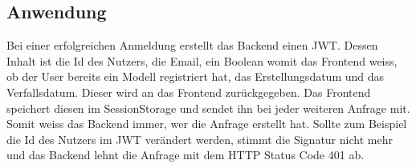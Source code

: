 \subsection{Anwendung} \label{andwendung-jwt}
Bei einer erfolgreichen Anmeldung erstellt das Backend einen JWT. Dessen Inhalt ist die Id des Nutzers, die Email, ein Boolean womit das Frontend weiss, ob der User bereits ein Modell registriert hat, das Erstellungsdatum und das Verfallsdatum. Dieser wird an das Frontend zurückgegeben. Das Frontend speichert diesen im SessionStorage und sendet ihn bei jeder weiteren Anfrage mit. Somit weiss das Backend immer, wer die Anfrage erstellt hat.
\newline
Sollte zum Beispiel die Id des Nutzers im  JWT verändert werden, stimmt die Signatur nicht mehr und das Backend lehnt die Anfrage mit dem HTTP Status Code 401 ab.